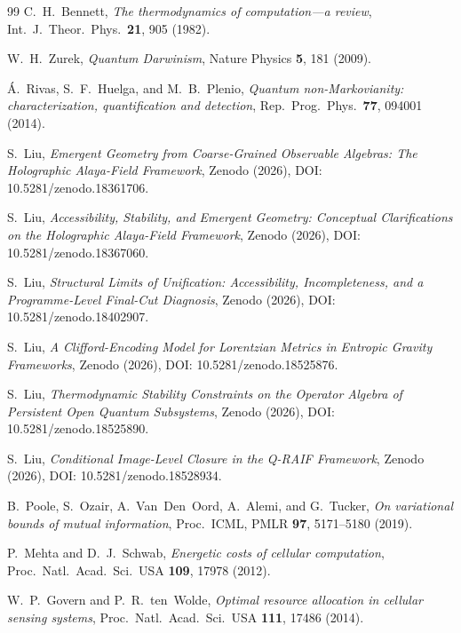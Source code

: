 \documentclass[12pt]{article}
\begin{document}
\begin{thebibliography}{99}
C.~H.~Bennett,
\emph{The thermodynamics of computation---a review},
Int.\ J.\ Theor.\ Phys.\ \textbf{21}, 905 (1982).

W.~H.~Zurek,
\emph{Quantum Darwinism},
Nature Physics \textbf{5}, 181 (2009).

\'{A}.~Rivas, S.~F.~Huelga, and M.~B.~Plenio,
\emph{Quantum non-Markovianity: characterization,
quantification and detection},
Rep.\ Prog.\ Phys.\ \textbf{77}, 094001 (2014).

S.~Liu, \emph{Emergent Geometry from Coarse-Grained Observable Algebras: The Holographic Alaya-Field Framework}, Zenodo (2026), DOI: 10.5281/zenodo.18361706.

S.~Liu, \emph{Accessibility, Stability, and Emergent Geometry: Conceptual Clarifications on the Holographic Alaya-Field Framework}, Zenodo (2026), DOI: 10.5281/zenodo.18367060.

S.~Liu, \emph{Structural Limits of Unification: Accessibility, Incompleteness, and a Programme-Level Final-Cut Diagnosis}, Zenodo (2026), DOI: 10.5281/zenodo.18402907.

S.~Liu, \emph{A Clifford-Encoding Model for Lorentzian Metrics in Entropic Gravity Frameworks}, Zenodo (2026), DOI: 10.5281/zenodo.18525876.

S.~Liu, \emph{Thermodynamic Stability Constraints on the Operator Algebra of Persistent Open Quantum Subsystems}, Zenodo (2026), DOI: 10.5281/zenodo.18525890.

S.~Liu, \emph{Conditional Image-Level Closure in the Q-RAIF Framework}, Zenodo (2026), DOI: 10.5281/zenodo.18528934.

B.~Poole, S.~Ozair, A.~Van~Den~Oord, A.~Alemi, and G.~Tucker,
\emph{On variational bounds of mutual information},
Proc.\ ICML, PMLR \textbf{97}, 5171--5180 (2019).

P.~Mehta and D.~J.~Schwab,
\emph{Energetic costs of cellular computation},
Proc.\ Natl.\ Acad.\ Sci.\ USA \textbf{109}, 17978 (2012).

W.~P.~Govern and P.~R.~ten~Wolde,
\emph{Optimal resource allocation in cellular sensing systems},
Proc.\ Natl.\ Acad.\ Sci.\ USA \textbf{111}, 17486 (2014).

\end{thebibliography}
\end{document}
